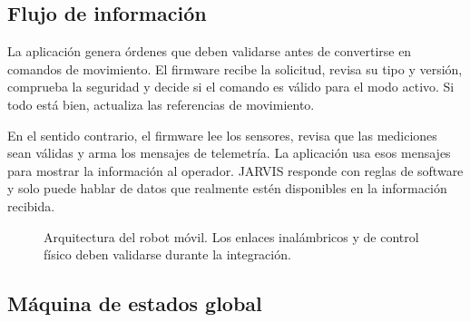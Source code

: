 \documentclass[journal]{IEEEtran}
\begin{document}
\subsection{Flujo de información}

La aplicación genera órdenes que deben validarse antes de convertirse en comandos de movimiento. El firmware recibe la solicitud, revisa su tipo y versión, comprueba la seguridad y decide si el comando es válido para el modo activo. Si todo está bien, actualiza las referencias de movimiento.

En el sentido contrario, el firmware lee los sensores, revisa que las mediciones sean válidas y arma los mensajes de telemetría. La aplicación usa esos mensajes para mostrar la información al operador. JARVIS responde con reglas de software y solo puede hablar de datos que realmente estén disponibles en la información recibida.

\begin{figure}[H]
\centering
{}
\caption{Arquitectura del robot móvil. Los enlaces inalámbricos y de control físico deben validarse durante la integración.}
\label{fig:arquitectura}
\end{figure}

\subsection{Máquina de estados global}
\end{document}
